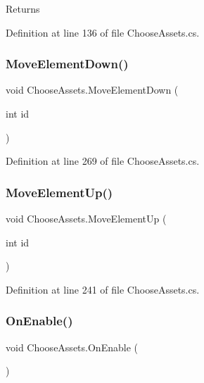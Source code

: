 \begin{DoxyReturn}{Returns}

\end{DoxyReturn}


Definition at line 136 of file Choose\+Assets.\+cs.

\mbox{\label{class_choose_assets_ab65fa20ae8df3bc993f89259aac7b0f1}} 
\subsubsection{Move\+Element\+Down()}
{\footnotesize\ttfamily void Choose\+Assets.\+Move\+Element\+Down (\begin{DoxyParamCaption}\item[{int}]{id }\end{DoxyParamCaption})}



Definition at line 269 of file Choose\+Assets.\+cs.

\mbox{\label{class_choose_assets_a892154344570fc0ca4d5cda73c2a88c4}} 
\subsubsection{Move\+Element\+Up()}
{\footnotesize\ttfamily void Choose\+Assets.\+Move\+Element\+Up (\begin{DoxyParamCaption}\item[{int}]{id }\end{DoxyParamCaption})}



Definition at line 241 of file Choose\+Assets.\+cs.

\mbox{\label{class_choose_assets_af97999a56f830b311a3ff9517a259666}} 
\subsubsection{On\+Enable()}
{\footnotesize\ttfamily void Choose\+Assets.\+On\+Enable (\begin{DoxyParamCaption}{ }\end{DoxyParamCaption})}



